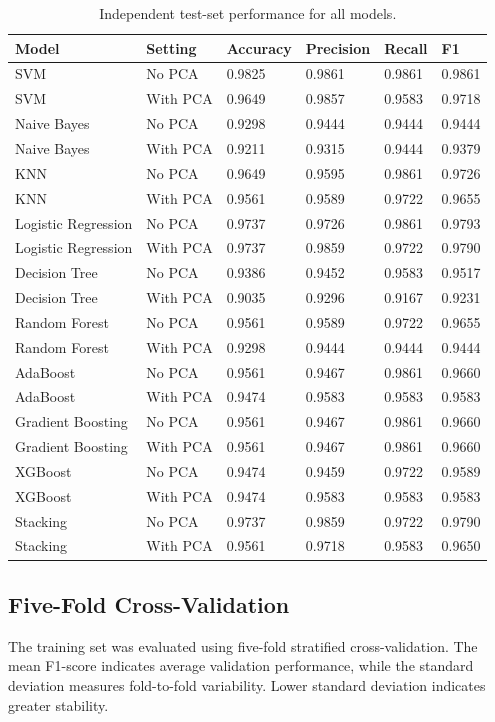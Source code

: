 \documentclass[12pt,a4paper]{article}
\begin{document}
\begin{longtable}{|p{3.2cm}|p{1.3cm}|p{1.3cm}|p{1.3cm}|p{1.3cm}|p{1.3cm}|}
\caption{Independent test-set performance for all models.}\\
\hline
\textbf{Model} & \textbf{Setting} & \textbf{Accuracy} & \textbf{Precision} & \textbf{Recall} & \textbf{F1}\\ \hline
SVM & No PCA & 0.9825 & 0.9861 & 0.9861 & 0.9861 \\
SVM & With PCA & 0.9649 & 0.9857 & 0.9583 & 0.9718 \\
Naive Bayes & No PCA & 0.9298 & 0.9444 & 0.9444 & 0.9444 \\
Naive Bayes & With PCA & 0.9211 & 0.9315 & 0.9444 & 0.9379 \\
KNN & No PCA & 0.9649 & 0.9595 & 0.9861 & 0.9726 \\
KNN & With PCA & 0.9561 & 0.9589 & 0.9722 & 0.9655 \\
Logistic Regression & No PCA & 0.9737 & 0.9726 & 0.9861 & 0.9793 \\
Logistic Regression & With PCA & 0.9737 & 0.9859 & 0.9722 & 0.9790 \\
Decision Tree & No PCA & 0.9386 & 0.9452 & 0.9583 & 0.9517 \\
Decision Tree & With PCA & 0.9035 & 0.9296 & 0.9167 & 0.9231 \\
Random Forest & No PCA & 0.9561 & 0.9589 & 0.9722 & 0.9655 \\
Random Forest & With PCA & 0.9298 & 0.9444 & 0.9444 & 0.9444 \\
AdaBoost & No PCA & 0.9561 & 0.9467 & 0.9861 & 0.9660 \\
AdaBoost & With PCA & 0.9474 & 0.9583 & 0.9583 & 0.9583 \\
Gradient Boosting & No PCA & 0.9561 & 0.9467 & 0.9861 & 0.9660 \\
Gradient Boosting & With PCA & 0.9561 & 0.9467 & 0.9861 & 0.9660 \\
XGBoost & No PCA & 0.9474 & 0.9459 & 0.9722 & 0.9589 \\
XGBoost & With PCA & 0.9474 & 0.9583 & 0.9583 & 0.9583 \\
Stacking & No PCA & 0.9737 & 0.9859 & 0.9722 & 0.9790 \\
Stacking & With PCA & 0.9561 & 0.9718 & 0.9583 & 0.9650 \\
\hline
\end{longtable}

\subsection{Five-Fold Cross-Validation}
The training set was evaluated using five-fold stratified cross-validation. The mean F1-score indicates average validation performance, while the standard deviation measures fold-to-fold variability. Lower standard deviation indicates greater stability.
\end{document}
